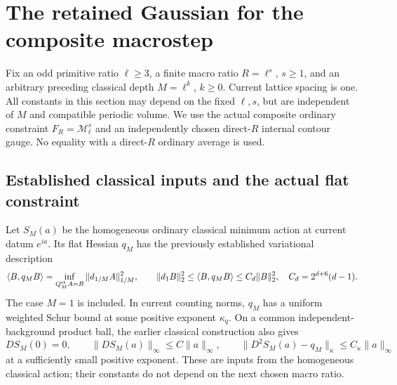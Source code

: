 \section{The retained Gaussian for the composite macrostep}
\label{cmq-section}

Fix an odd primitive ratio $\ell\geq3$, a finite macro ratio
$R=\ell^s$, $s\geq1$, and an arbitrary preceding classical depth
$M=\ell^k$, $k\geq0$. Current lattice spacing is one. All constants
in this section may depend on the fixed $\ell,s$, but are independent
of $M$ and compatible periodic volume. We use the actual composite
ordinary constraint $F_R=\mathcal M_\ell^s$ and an independently chosen
direct-$R$ internal contour gauge. No equality with a direct-$R$
ordinary average is used.

\subsection{Established classical inputs and the actual flat constraint}
\label{cmq-input-section}

Let $S_M(a)$ be the homogeneous ordinary classical minimum action
at current datum $e^{ia}$. Its flat Hessian $q_M$ has the previously
established variational description
\begin{equation}
 \langle B,q_MB\rangle
 =\inf_{Q_M^{\rm st} A=B}\|d_{1/M}A\|_{1/M}^2,
 \qquad
 \|d_1B\|_2^2\leq\langle B,q_MB\rangle
 \leq C_d\|B\|_2^2,
 \quad C_d=2^{d+6}(d-1).
 \label{cmq-classical-input}
\end{equation}
The case $M=1$ is included. In current counting norms, $q_M$ has a
uniform weighted Schur bound at some positive exponent $\kappa_q$.
On a common independent-background product ball, the earlier
classical construction also gives
\begin{equation}
 DS_M(0)=0,\qquad
 \|DS_M(a)\|_\infty\leq C\|a\|_\infty,
 \qquad
 \|D^2S_M(a)-q_M\|_\kappa\leq C_\kappa\|a\|_\infty
 \label{cmq-classical-nonlinear-input}
\end{equation}
at a sufficiently small positive exponent. These are inputs from
the homogeneous classical action; their constants do not depend
on the next chosen macro ratio.

